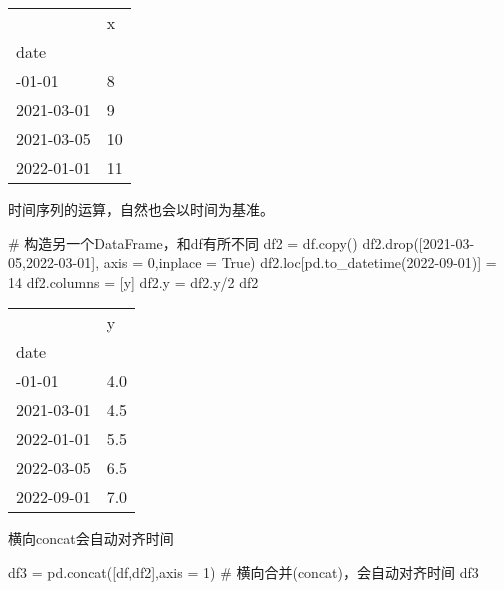 \documentclass[
  letterpaper,
  DIV=11,
  numbers=noendperiod]{scrreprt}
\newenvironment{Shaded}{\begin{snugshade}}{\end{snugshade}}
\newcommand{\CommentTok}[1]{\textcolor[rgb]{0.37,0.37,0.37}{#1}}
\newcommand{\DecValTok}[1]{\textcolor[rgb]{0.68,0.00,0.00}{#1}}
\newcommand{\NormalTok}[1]{\textcolor[rgb]{0.00,0.23,0.31}{#1}}
\newcommand{\OperatorTok}[1]{\textcolor[rgb]{0.37,0.37,0.37}{#1}}
\newcommand{\StringTok}[1]{\textcolor[rgb]{0.13,0.47,0.30}{#1}}
\newcommand{\VariableTok}[1]{\textcolor[rgb]{0.07,0.07,0.07}{#1}}
\begin{document}
\begin{longtable}[]{@{}ll@{}}
\toprule\noalign{}
& x \\
date & \\
\midrule\noalign{}
\endhead
\bottomrule\noalign{}
\endlastfoot
2021-01-01 & 8 \\
2021-03-01 & 9 \\
2021-03-05 & 10 \\
2022-01-01 & 11 \\
\end{longtable}

时间序列的运算，自然也会以时间为基准。

\begin{Shaded}
\begin{Highlighting}[]
\CommentTok{\# 构造另一个DataFrame，和df有所不同}
\NormalTok{df2 }\OperatorTok{=}\NormalTok{ df.copy()}
\NormalTok{df2.drop([}\StringTok{\textquotesingle{}2021{-}03{-}05\textquotesingle{}}\NormalTok{,}\StringTok{\textquotesingle{}2022{-}03{-}01\textquotesingle{}}\NormalTok{], axis }\OperatorTok{=} \DecValTok{0}\NormalTok{,inplace }\OperatorTok{=} \VariableTok{True}\NormalTok{)}
\NormalTok{df2.loc[pd.to\_datetime(}\StringTok{\textquotesingle{}2022{-}09{-}01\textquotesingle{}}\NormalTok{)] }\OperatorTok{=} \DecValTok{14}
\NormalTok{df2.columns }\OperatorTok{=}\NormalTok{ [}\StringTok{\textquotesingle{}y\textquotesingle{}}\NormalTok{]}
\NormalTok{df2.y }\OperatorTok{=}\NormalTok{ df2.y}\OperatorTok{/}\DecValTok{2}
\NormalTok{df2}
\end{Highlighting}
\end{Shaded}

\begin{longtable}[]{@{}ll@{}}
\toprule\noalign{}
& y \\
date & \\
\midrule\noalign{}
\endhead
\bottomrule\noalign{}
\endlastfoot
2021-01-01 & 4.0 \\
2021-03-01 & 4.5 \\
2022-01-01 & 5.5 \\
2022-03-05 & 6.5 \\
2022-09-01 & 7.0 \\
\end{longtable}

横向concat会自动对齐时间

\begin{Shaded}
\begin{Highlighting}[]
\NormalTok{df3 }\OperatorTok{=}\NormalTok{ pd.concat([df,df2],axis }\OperatorTok{=} \DecValTok{1}\NormalTok{) }\CommentTok{\# 横向合并(concat)，会自动对齐时间}
\NormalTok{df3}
\end{Highlighting}
\end{Shaded}
\end{document}
